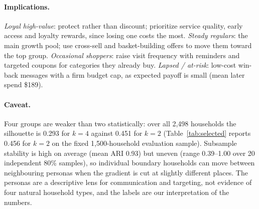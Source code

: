 \paragraph{Implications.} \emph{Loyal high-value}: protect rather than discount; prioritize service quality, early access and loyalty rewards, since losing one costs the most. \emph{Steady regulars}: the main growth pool; use cross-sell and basket-building offers to move them toward the top group. \emph{Occasional shoppers}: raise visit frequency with reminders and targeted coupons for categories they already buy. \emph{Lapsed / at-risk}: low-cost win-back messages with a firm budget cap, as expected payoff is small (mean later spend \$189).

\paragraph{Caveat.} Four groups are weaker than two statistically: over all 2,498 households the silhouette is 0.293 for $k=4$ against 0.451 for $k=2$ (Table~\ref{tab:selected} reports 0.456 for $k=2$ on the fixed 1,500-household evaluation sample). Subsample stability is high on average (mean ARI 0.93) but uneven (range 0.39--1.00 over 20 independent 80\% samples), so individual boundary households can move between neighbouring personas when the gradient is cut at slightly different places. The personas are a descriptive lens for communication and targeting, not evidence of four natural household types, and the labels are our interpretation of the numbers.

